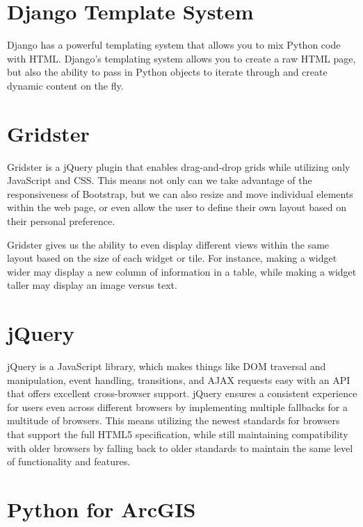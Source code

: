 \documentclass[12pt]{article}
\begin{document}
\section{Django Template System~\cite{django-template-2014}}

Django has a powerful templating system that allows you to mix Python code with HTML.  Django’s templating system allows you to create a raw HTML page, but also the ability to pass in Python objects to iterate through and create dynamic content on the fly.

\section{Gridster~\cite{gridster-2014}}

Gridster is a jQuery plugin that enables drag-and-drop grids while utilizing only JavaScript and CSS. This means not only can we take advantage of the responsiveness of Bootstrap, but we can also resize and move individual elements within the web page, or even allow the user to define their own layout based on their personal preference.

Gridster gives us the ability to even display different views within the same layout based on the size of each widget or tile.  For instance, making a widget wider may display a new column of information in a table, while making a widget taller may display an image versus text.

\section{jQuery~\cite{jquery-2014}}

jQuery is a JavaScript library, which makes things like DOM traversal and manipulation, event handling, transitions, and AJAX requests easy with an API that offers excellent cross-browser support. jQuery ensures a consistent experience for users even across different browsers by implementing multiple fallbacks for a multitude of browsers.  This means utilizing the newest standards for browsers that support the full HTML5 specification, while still maintaining compatibility
with older browsers by falling back to older standards to maintain the same level of functionality and features.

\section{Python for ArcGIS~\cite{arcpy-2014}}
\end{document}
